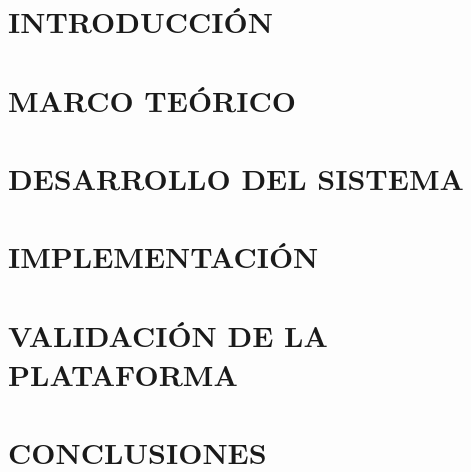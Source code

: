 \documentclass[12pt]{article}
\begin{document}
\newpage


\setcounter{page}{1}
\renewcommand{\thepage}{\arabic{page}}

\section{INTRODUCCIÓN} \label{intro}


\newpage
\section{MARCO TEÓRICO}



\newpage
\section{DESARROLLO DEL SISTEMA} \label{Desarrollo_Sistema}



\newpage
\section{IMPLEMENTACIÓN}


\newpage
\section{VALIDACIÓN DE LA PLATAFORMA}



\newpage
\section{CONCLUSIONES}

\end{document}
